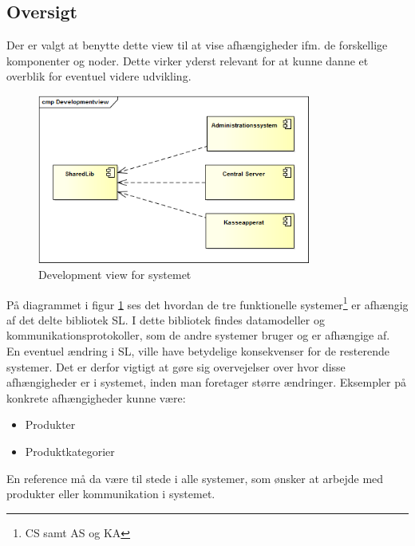 \subsection{Oversigt}

Der er valgt at benytte dette view til at vise afhængigheder ifm. de forskellige komponenter og noder. 
Dette virker yderst relevant for at kunne danne et overblik for eventuel videre udvikling.


\begin{figure}[htb]
    \centering
    \includegraphics[width=0.8\textwidth]{Systemarkitektur/ImplementeringsView/Billeder/Development.png}
    \caption{Development view for systemet}
    \label{fig:devview}
\end{figure}


På diagrammet i figur \ref{fig:devview} ses det hvordan de tre funktionelle systemer\footnote{\gls{CS} samt \gls{AS} og \gls{KA}} er afhængig af det delte bibliotek \gls{SL}. I dette bibliotek findes datamodeller og kommunikationsprotokoller, som de andre systemer bruger og er afhængige af.\\
En eventuel ændring i \gls{SL}, ville have betydelige konsekvenser for de resterende systemer. Det er derfor vigtigt at gøre sig overvejelser over hvor disse afhængigheder er i systemet, inden man foretager større ændringer. Eksempler på konkrete afhængigheder kunne være:

\begin{itemize}
  \item Produkter
  \item Produktkategorier
\end{itemize}

En reference må da være til stede i alle systemer, som ønsker at arbejde med produkter eller kommunikation i systemet.